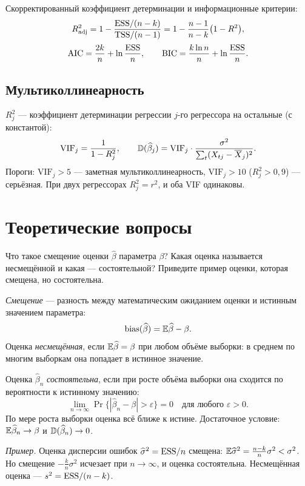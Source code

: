 Скорректированный коэффициент детерминации и информационные критерии:
\begin{gather}
  R^2_{\text{adj}}
  = 1 - \frac{\mathrm{ESS}/(n-k)}{\mathrm{TSS}/(n-1)}
  = 1 - \frac{n-1}{n-k}\bigl(1 - R^2\bigr),
  \label{eq:adj} \\[2pt]
  \mathrm{AIC} = \frac{2k}{n} + \ln\frac{\mathrm{ESS}}{n},
  \qquad
  \mathrm{BIC} = \frac{k\ln n}{n} + \ln\frac{\mathrm{ESS}}{n}.
  \notag
\end{gather}

\subsection{Мультиколлинеарность}\label{sec:vif}

$R_j^2$ — коэффициент детерминации регрессии $j$-го регрессора на остальные
(с константой):
\begin{equation}
  \mathrm{VIF}_j = \frac{1}{1 - R_j^2},
  \qquad
  \mathbb{D}(\widehat{\beta}_j) = \mathrm{VIF}_j\cdot\frac{\sigma^2}{\sum_t(X_{tj} - \overline{X}_j)^2}.
  \label{eq:vif}
\end{equation}
Пороги: $\mathrm{VIF}_j > 5$ — заметная мультиколлинеарность,
$\mathrm{VIF}_j > 10$ ($R_j^2 > 0{,}9$) — серьёзная. При двух регрессорах
$R_j^2 = r^2$, и оба VIF одинаковы.
\fi

\section{Теоретические вопросы}


Что такое смещение оценки $\widehat{\beta}$ параметра $\beta$? Какая оценка
называется несмещённой и какая — состоятельной? Приведите пример оценки,
которая смещена, но состоятельна.

\begin{solution}
\emph{Смещение} — разность между математическим ожиданием оценки и истинным
значением параметра:
\[
  \operatorname{bias}(\widehat{\beta}) = \mathbb{E}\widehat{\beta} - \beta .
\]
Оценка \emph{несмещённая}, если $\mathbb{E}\widehat{\beta} = \beta$ при любом объёме
выборки: в среднем по многим выборкам она попадает в истинное значение.

Оценка $\widehat{\beta}_n$ \emph{состоятельна}, если при росте объёма выборки
она сходится по вероятности к истинному значению:
\[
  \lim_{n\to\infty}\Pr\bigl\{|\widehat{\beta}_n - \beta| > \varepsilon\bigr\} = 0
  \quad\text{для любого } \varepsilon > 0 .
\]
По мере роста выборки оценка всё ближе к истине. Достаточное условие:
$\mathbb{E}\widehat{\beta}_n \to \beta$ и $\mathbb{D}(\widehat{\beta}_n) \to 0$.

\emph{Пример.} Оценка дисперсии ошибок $\widehat{\sigma}^2 = \mathrm{ESS}/n$ смещена:
$\mathbb{E}\widehat{\sigma}^2 = \frac{n-k}{n}\sigma^2 < \sigma^2$. Но смещение
$-\frac{k}{n}\sigma^2$ исчезает при $n \to \infty$, и оценка состоятельна.
Несмещённая оценка — $s^2 = \mathrm{ESS}/(n-k)$.
\end{solution}

